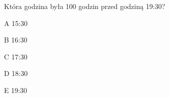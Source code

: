 \begin{tresc}
Która godzina była 100 godzin przed godziną 19:30?
\end{tresc}
\begin{wariant}{A} 15:30 \end{wariant}
\begin{wariant}{B} 16:30 \end{wariant}
\begin{wariant}{C} 17:30 \end{wariant}
\begin{wariant}{D} 18:30 \end{wariant}
\begin{wariant}{E} 19:30 \end{wariant}
